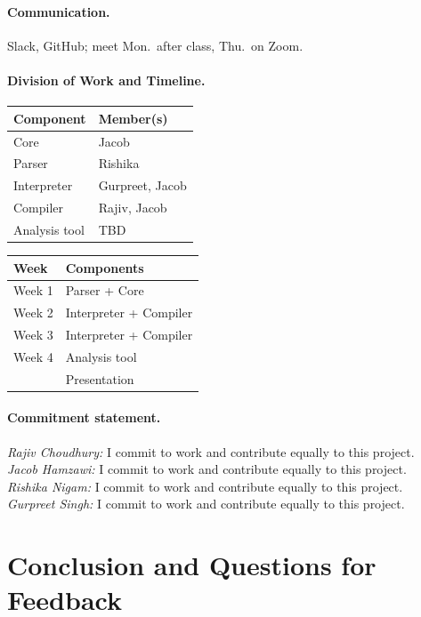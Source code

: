 \documentclass[12pt, letterpaper]{article}
\begin{document}
\paragraph{Communication.}Slack, GitHub; meet Mon.\ after class, Thu.\ on Zoom.

\paragraph{Division of Work and Timeline.}\mbox{}

\noindent
\begin{tabular}[t]{ll}
  \textbf{Component} & \textbf{Member(s)} \\
  \hline
  Core & Jacob \\
  Parser & Rishika \\
  Interpreter & Gurpreet, Jacob \\
  Compiler & Rajiv, Jacob  \\
  Analysis tool & TBD \\
\end{tabular}
\hfill
\begin{tabular}[t]{ll}
  \textbf{Week} & \textbf{Components} \\
  \hline
  Week 1 & Parser + Core \\
  Week 2 & Interpreter + Compiler \\
  Week 3 & Interpreter + Compiler \\
  Week 4 & Analysis tool \\
         & Presentation \\
\end{tabular}

\paragraph{Commitment statement.}\mbox{}

\noindent\emph{Rajiv Choudhury:} I commit to work and contribute equally to this project.\\
\emph{Jacob Hamzawi:} I commit to work and contribute equally to this project.\\
\emph{Rishika Nigam:} I commit to work and contribute equally to this project.\\
\emph{Gurpreet Singh:} I commit to work and contribute equally to this project.

\section{Conclusion and Questions for Feedback}
\end{document}
